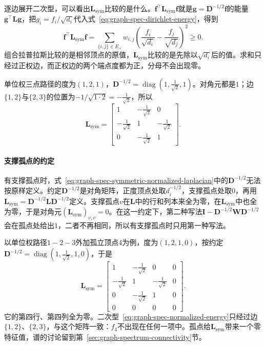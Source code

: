 逐边展开二次型，可以看出$\bm L_{\mathrm{sym}}$比较的是什么。$\bm f^{\top}\bm L_{\mathrm{sym}}\bm f$就是$\bm g=\bm D^{-1/2}\bm f$的能量$\bm g^{\top}\bm L\bm g$，把$g_i=f_i/\sqrt{d_i}$代入式~\eqref{eq:graph-spec-dirichlet-energy}，得到
\begin{equation}
 \bm f^{\top}\bm L_{\mathrm{sym}}\bm f=\sum_{\{i,j\}\in E_+}w_{i,j}\left(\frac{f_i}{\sqrt{d_i}}-\frac{f_j}{\sqrt{d_j}}\right)^2\geq0 .
 \label{eq:graph-spec-normalized-energy}
\end{equation}
组合拉普拉斯比较的是相邻顶点的原值，$\bm L_{\mathrm{sym}}$比较的是先除以$\sqrt{d_i}$后的值。求和只经过正权边，而正权边的两个端点度都为正，分母不会出现零。

单位权三点路径的度为$(1,2,1)$，$\bm D^{-1/2}=\operatorname{diag}(1,\tfrac1{\sqrt2},1)$。对角元都是$1$；边$\{1,2\}$与$\{2,3\}$的位置为$-1/\sqrt{1\cdot2}=-\tfrac1{\sqrt2}$，所以
\[
 \bm L_{\mathrm{sym}}=\begin{bmatrix}1&-\tfrac1{\sqrt2}&0\\-\tfrac1{\sqrt2}&1&-\tfrac1{\sqrt2}\\0&-\tfrac1{\sqrt2}&1\end{bmatrix}.
\]

\paragraph{支撑孤点的约定}
有支撑孤点时，式~\eqref{eq:graph-spec-symmetric-normalized-laplacian}中的$\bm D^{-1/2}$无法按原样定义。约定$\bm D^{-1/2}$是对角矩阵，正度顶点处取$d_i^{-1/2}$，支撑孤点处取$0$，再用$\bm L_{\mathrm{sym}}=\bm D^{-1/2}\bm L\bm D^{-1/2}$定义。支撑孤点$v$在$\bm L$中的行和列本来全为零，在$\bm L_{\mathrm{sym}}$中也全为零，于是对角元$(\bm L_{\mathrm{sym}})_{v,v}=0$。在这一约定下，第二种写法$\bm I-\bm D^{-1/2}\bm W\bm D^{-1/2}$会在孤点处给出$1$，二者不再相同，所以有支撑孤点时只用第一种写法。

以单位权路径$1-2-3$外加孤立顶点$4$为例，度为$(1,2,1,0)$，按约定$\bm D^{-1/2}=\operatorname{diag}(1,\tfrac1{\sqrt2},1,0)$，于是
\[
 \bm L_{\mathrm{sym}}=\begin{bmatrix}1&-\tfrac1{\sqrt2}&0&0\\-\tfrac1{\sqrt2}&1&-\tfrac1{\sqrt2}&0\\0&-\tfrac1{\sqrt2}&1&0\\0&0&0&0\end{bmatrix}.
\]
它的第四行、第四列全为零。二次型~\eqref{eq:graph-spec-normalized-energy}只经过边$\{1,2\}$、$\{2,3\}$，与这个矩阵一致：$f_4$不出现在任何一项中。孤点给$\bm L_{\mathrm{sym}}$带来一个零特征值，谱的讨论留到第~\ref{sec:graph-spectrum-connectivity}节。

